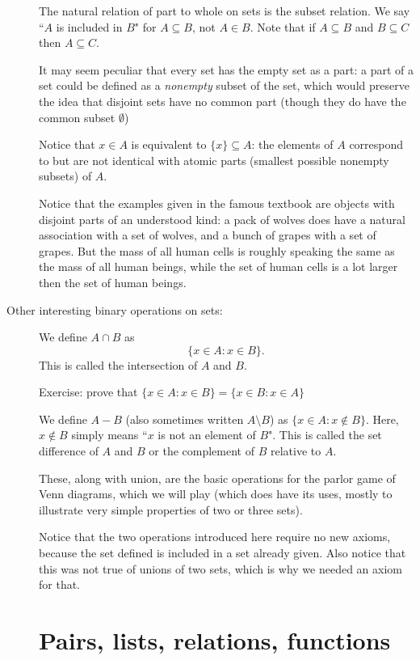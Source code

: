 \documentclass[12pt]{article}
\begin{document}
\begin{description}
The natural relation of part to whole on sets is the subset relation.  We say ``$A$ is included in $B$" for $A \subseteq B$, not $A \in B$.  Note that if $A \subseteq B$ and $B \subseteq C$ then $A \subseteq C$.

It may seem peculiar that every set has the empty set as a part:  a part of a set could be defined as a {\em nonempty\/} subset of the set, which would preserve the idea that disjoint sets have no common part (though they do have the common subset $\emptyset$)

Notice that $x \in A$ is equivalent to $\{x\} \subseteq A$:  the elements of $A$ correspond to but are not identical with atomic parts (smallest possible nonempty subsets) of $A$.

Notice that the examples given in the famous textbook are objects with disjoint parts of an understood kind:  a pack of wolves does have a natural association with a set of wolves, and a bunch of grapes with a set of grapes.   But the mass of all human cells is roughly speaking the same as the mass of all human beings, while the set of human cells is a lot larger then the set of human beings.




\item[Other interesting binary operations on sets:]

We define $A \cap B$ as $$\{x \in A:x \in B\}.$$  This is called the intersection of $A$ and $B$.

Exercise:  prove that $\{x \in A:x \in B\} = \{x \in B:x \in A\}$

We define $A - B$ (also sometimes written $A \setminus B$) as $\{x \in A:x \not\in B\}$.  Here, $x \not\in B$ simply means ``$x$ is not an element of $B$".
This is called the set difference of $A$ and $B$ or the complement of $B$ relative to $A$.

These, along with union, are the basic operations for the parlor game of Venn diagrams, which we will play (which does have its uses, mostly to illustrate very simple properties of two or three sets).

Notice that the two operations introduced here require no new axioms, because the set defined is included in a set already given.  Also notice that this was not true of unions of two sets, which is why we needed an axiom for that.

\newpage



\section{Pairs, lists, relations, functions}



\end{description}
\end{document}
